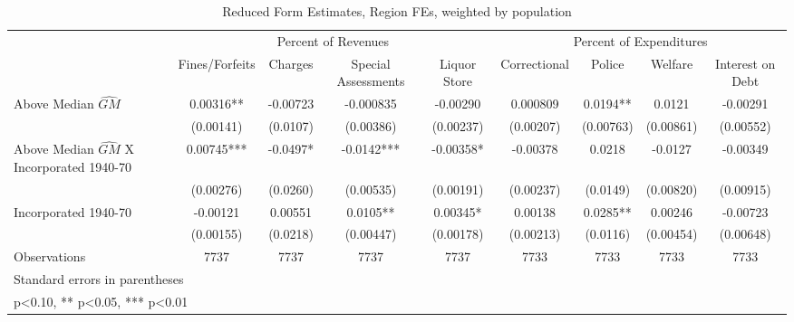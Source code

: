 \begin{table}[htbp]\centering
\def\sym#1{\ifmmode^{#1}\else\(^{#1}\)\fi}
\caption{Reduced Form Estimates, Region FEs, weighted by population}
\begin{tabular}{l*{8}{c}}
\toprule
                    &\multicolumn{4}{c}{Percent of Revenues}                        &\multicolumn{4}{c}{Percent of Expenditures}                    \\\cmidrule(lr){2-5}\cmidrule(lr){6-9}
                    &\multicolumn{1}{c}{Fines/Forfeits}&\multicolumn{1}{c}{Charges}&\multicolumn{1}{c}{Special Assessments}&\multicolumn{1}{c}{Liquor Store}&\multicolumn{1}{c}{Correctional}&\multicolumn{1}{c}{Police}&\multicolumn{1}{c}{Welfare}&\multicolumn{1}{c}{Interest on Debt}\\
\midrule
Above Median $\widehat{GM}$&     0.00316** &    -0.00723   &   -0.000835   &    -0.00290   &    0.000809   &      0.0194** &      0.0121   &    -0.00291   \\
                    &   (0.00141)   &    (0.0107)   &   (0.00386)   &   (0.00237)   &   (0.00207)   &   (0.00763)   &   (0.00861)   &   (0.00552)   \\
\addlinespace
Above Median $\widehat{GM}$ X Incorporated 1940-70&     0.00745***&     -0.0497*  &     -0.0142***&    -0.00358*  &    -0.00378   &      0.0218   &     -0.0127   &    -0.00349   \\
                    &   (0.00276)   &    (0.0260)   &   (0.00535)   &   (0.00191)   &   (0.00237)   &    (0.0149)   &   (0.00820)   &   (0.00915)   \\
\addlinespace
Incorporated 1940-70&    -0.00121   &     0.00551   &      0.0105** &     0.00345*  &     0.00138   &      0.0285** &     0.00246   &    -0.00723   \\
                    &   (0.00155)   &    (0.0218)   &   (0.00447)   &   (0.00178)   &   (0.00213)   &    (0.0116)   &   (0.00454)   &   (0.00648)   \\
\midrule
Observations        &        7737   &        7737   &        7737   &        7737   &        7733   &        7733   &        7733   &        7733   \\
\bottomrule
\multicolumn{9}{l}{\footnotesize Standard errors in parentheses}\\
\multicolumn{9}{l}{\footnotesize * p<0.10, ** p<0.05, *** p<0.01}\\
\end{tabular}
\end{table}
